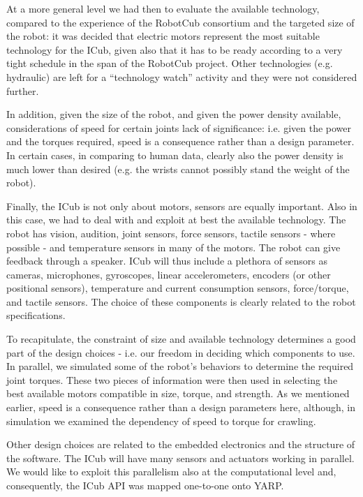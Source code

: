 At a more general level we had then to evaluate the available technology, compared 
to the experience of the RobotCub consortium and the targeted size of the robot: 
it was decided that electric motors represent the most suitable technology for 
the ICub, given also that it has to be ready according to a very 
tight schedule in the span of the RobotCub project. Other technologies 
(e.g. hydraulic) are left for a ``technology watch'' activity and they were 
not considered further.

In addition, given the size of the robot, and given the power density available, 
considerations of speed for certain joints lack of significance: i.e. given the 
power and the torques required, speed is a consequence rather than a design 
parameter. In certain cases, in comparing to human data, clearly also the power 
density is much lower than desired (e.g. the wrists cannot possibly stand the weight 
of the robot).

Finally, the ICub is not only about motors, sensors are equally important. 
Also in this case, we had to deal with and exploit at best the available technology. 
The robot has vision, audition, joint sensors, force sensors, tactile 
sensors - where possible - and temperature sensors in many of the motors. The robot 
can give feedback through a speaker. ICub will thus include a plethora of sensors as
cameras, microphones, gyroscopes, linear accelerometers, encoders (or other positional
sensors), temperature and current consumption sensors, force/torque, and tactile
sensors. The choice of these components is clearly related to the robot specifications.

To recapitulate, the constraint of size and available technology determines a good 
part of the design choices - i.e. our freedom in deciding which components to use. 
In parallel, we simulated some of the robot's behaviors to determine the required 
joint torques. These two pieces of information were then used in selecting the best 
available motors compatible in size, torque, and strength. As we mentioned earlier, 
speed is a consequence rather than a design parameters here, although, in simulation we 
examined the dependency of speed to torque for crawling.

Other design choices are related to the embedded electronics and the structure of 
the software. The ICub will have many sensors and actuators working in parallel. We 
would like to exploit this parallelism also at the computational level and, consequently, 
the ICub API was mapped one-to-one onto YARP.

